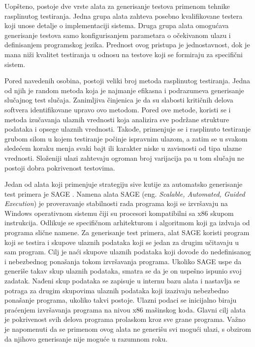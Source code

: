 \documentclass[12pt,oneside]{memoir}
\begin{document}
Uopšteno, postoje dve vrste alata za generisanje testova primenom tehnike rasplinutog testiranja. Jedna grupa alata zahteva posebno kvalifikovane testera koji unose detalje o implementaciji sistema. Druga grupa alata omogućava generisanje testova samo konfigurisanjem parametara o očekivanom ulazu i definisanjem programskog jezika. Prednost ovog pristupa je jednostavnost, dok je mana niži kvalitet testiranja u odnosu na testove koji se formiraju za specifični sistem. 
\par
Pored navedenih osobina, postoji veliki broj metoda rasplinutog testiranja. Jedna od njih je random metoda koja je najmanje efikasna i podrazumeva generisanje slučajnog test slučaja. Zanimljiva činjenica je da su slabosti kritičnih delova softvera identifikovane upravo ovo metodom. Pored ove metode, koristi se i metoda izučavanja ulaznih vrednosti koja analizira sve podržane strukture podataka i opsege ulaznih vrednosti. Takođe, primenjuje se i rasplinuto testiranje grubom silom u kojem testiranje počinje ispravnim ulazom, a zatim se u svakom sledećem koraku menja svaki bajt ili karakter niske u zavisnosti od tipa ulazne vrednosti. Složeniji ulazi zahtevaju ogroman broj varijacija pa u tom slučaju ne postoji dobra pokrivenost testovima.
\par
Jedan od alata koji primenjuje strategiju sive kutije za automatsko generisanje test primera je SAGE \cite{ToolSAGE}. Namena alata SAGE (eng. \textit{Scalable, Automated, Guided Execution}) je proveravanje stabilnosti rada programa koji se izvršavaju na Windows operativnom sistemu čiji su procesori kompatibilni sa x86 skupom instrukcija. Odlikuje se specifičnom arhitekturom i algoritmom koji ga izdvaja od programa slične namene. Za generisanje test primera, alat SAGE koristi program koji se testira i skupove ulaznih podataka koji se jedan za drugim učitavaju u sam program. Cilj je naći skupove ulaznih podataka koji dovode do nedefinisanog i nebezbednog ponašanja tokom izvršavanja programa. Ukoliko SAGE uspe da generiše takav skup ulaznih podataka, smatra se da je on uspešno ispunio svoj zadatak. Nađeni skup podataka se zapisuje u internu bazu alata i nastavlja se potraga za drugim skupovima ulaznih podataka koji izazivaju nebezbedno ponašanje programa, ukoliko takvi postoje. Ulazni podaci se inicijalno biraju praćenjem izvršavanja programa na nivou x86 mašinskog koda. Glavni cilj alata je pokrivenost svih delova programa prolaskom kroz sve grane programa. Važno je napomenuti da se primenom ovog alata ne generišu svi mogući ulazi, s obzirom da njihovo generisanje nije moguće u razumnom roku. 
\end{document}
